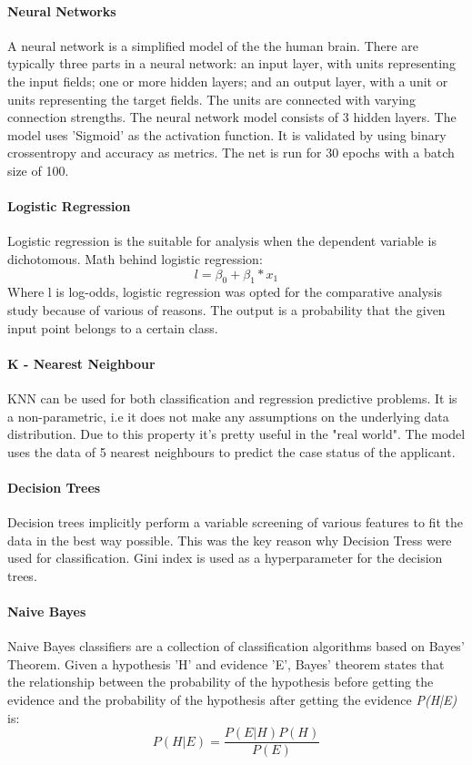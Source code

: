 \documentclass[conference]{IEEEtran}
\begin{document}
\paragraph{\textbf{Neural Networks}}
A neural network is a simplified model of the the human brain. There are typically three parts in a neural network: an input layer, with units representing the input fields; one or more hidden layers; and an output layer, with a unit or units representing the target fields. The units are connected with varying connection strengths. 
The neural network model consists of 3 hidden layers. The model uses 'Sigmoid' as the activation function. It is validated by using binary crossentropy and accuracy as metrics. The net is run for 30 epochs with a batch size of 100.

\paragraph{\textbf{Logistic Regression}}
Logistic regression is the suitable for analysis when the dependent variable is dichotomous. Math behind logistic regression:
\[l = \beta_0 + \beta_1*x_1\]Where l is log-odds, logistic regression was opted for the comparative analysis study because of various of reasons. The output is a probability that the given input point belongs to a certain class.

\paragraph{\textbf{K - Nearest Neighbour}}
KNN can be used for both classification and regression predictive problems. It is a non-parametric, i.e it does not make any assumptions on the underlying data distribution. Due to this property it’s pretty useful in the "real world". The model uses the data of 5 nearest neighbours to predict the case status of the applicant.

\paragraph{\textbf{Decision Trees}}
Decision trees implicitly perform a variable screening of various features to fit the data in the best way possible. This was the key reason why Decision Tress were used for classification. Gini index is used as a hyperparameter for the decision trees.

\paragraph{\textbf{Naive Bayes}}
Naive Bayes classifiers are a collection of classification algorithms based on Bayes’ Theorem. Given a hypothesis 'H'  and evidence 'E', Bayes' theorem states that the relationship between the probability of the hypothesis before getting the evidence  and the probability of the hypothesis after getting the evidence \textit{P(H|E)} is:\\
\begin{equation}
P(H|E) = \frac{P(E|H)P(H)}{P(E)}
\end{equation}
\\
\end{document}
